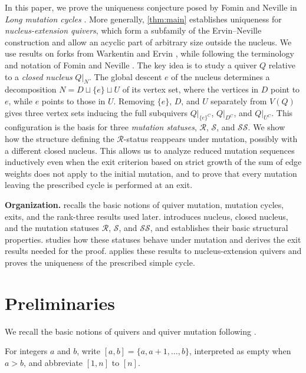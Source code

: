 \documentclass[10pt,a4paper]{amsart}
\theoremstyle{definition}
\theoremstyle{definition}
\numberwithin{equation}{section}
\numberwithin{table}{section}
\newcommand{\Rclass}{\mathcal{R}}
\newcommand{\SSclass}{\mathcal{SS}}
\newcommand{\Sclass}{\mathcal{S}}
\begin{document}
In this paper, we prove the uniqueness conjecture posed by Fomin and Neville
in \emph{Long mutation cycles} \cite{FN25}. More generally, \cref{thm:main}
establishes uniqueness for \emph{nucleus-extension quivers}, which form a subfamily
of the Ervin--Neville construction and allow an acyclic part of arbitrary
size outside the nucleus. We use results on forks from Warkentin \cite{War14} and
Ervin \cite{Erv24}, while following the terminology and notation of Fomin and Neville
\cite{FN25}. The key idea is to study a quiver $Q$ relative to a \emph{closed nucleus}
$Q|_N$.
The global descent $e$ of the nucleus determines a decomposition
$N=D\sqcup\{e\}\sqcup U$ of its vertex set, where the vertices in $D$ point to
$e$, while $e$ points to those in $U$. Removing $\{e\}$, $D$, and $U$ separately
from $V(Q)$ gives three vertex sets inducing the full subquivers
$Q|_{\{e\}^C}$, $Q|_{D^C}$, and $Q|_{U^C}$. This configuration is the basis for
three \emph{mutation statuses}, $\Rclass$, $\Sclass$, and $\SSclass$. We show how
the structure defining the $\Rclass$-status reappears under mutation, possibly
with a different closed nucleus. This allows us to analyze reduced mutation sequences
inductively even when the exit criterion based on strict growth of the sum
of edge weights does not apply to the initial mutation, and to prove that
every mutation leaving the prescribed cycle is performed at an exit.

\smallskip
\noindent\textbf{Organization.}
 recalls the basic notions of quiver mutation, mutation cycles,
exits, and the rank-three results used later.  introduces nucleus,
closed nucleus, and the mutation statuses $\Rclass$, $\Sclass$, and $\SSclass$, and
establishes their basic structural properties.  studies
how these statuses behave under mutation and derives the exit results needed for the
proof.  applies these results to nucleus-extension quivers and proves
the uniqueness of the prescribed simple cycle.

\section{Preliminaries}\label{sec:preliminaries}

We recall the basic notions of quivers and quiver mutation following
\cite{FWZ21}.

For integers $a$ and $b$, write $[a,b]=\{a,a+1,\ldots,b\}$, interpreted
as empty when $a>b$, and abbreviate $[1,n]$ to $[n]$.
\end{document}
